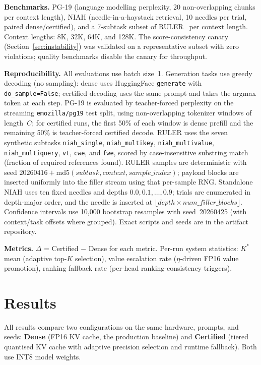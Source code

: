\documentclass[10pt,twocolumn,a4paper]{article}
\theoremstyle{definition}
\theoremstyle{remark}
\begin{document}
\textbf{Benchmarks.}  PG-19 (language modelling perplexity, 20 non-overlapping chunks per context length), NIAH (needle-in-a-haystack retrieval, 10 needles per trial, paired dense/certified), and a 7-subtask subset of RULER~\cite{ruler} per context length.  Context lengths: 8K, 32K, 64K, and 128K.  The score-consistency canary (Section~\ref{sec:instability}) was validated on a representative subset with zero violations; quality benchmarks disable the canary for throughput.

\textbf{Reproducibility.}  All evaluations use batch size~1.  Generation tasks use greedy decoding (no sampling): dense uses HuggingFace \texttt{generate} with \texttt{do\_sample=False}; certified decoding uses the same prompt and takes the argmax token at each step.  PG-19 is evaluated by teacher-forced perplexity on the streaming \texttt{emozilla/pg19} test split, using non-overlapping tokenizer windows of length~$C$; for certified runs, the first 50\% of each window is dense prefill and the remaining 50\% is teacher-forced certified decode.  RULER uses the seven synthetic subtasks \texttt{niah\_single}, \texttt{niah\_multikey}, \texttt{niah\_multivalue}, \texttt{niah\_multiquery}, \texttt{vt}, \texttt{cwe}, and \texttt{fwe}, scored by case-insensitive substring match (fraction of required references found).  RULER samples are deterministic with seed $20260416 + \mathrm{md5}(\mathit{subtask}, \mathit{context}, \mathit{sample\_index})$; payload blocks are inserted uniformly into the filler stream using that per-sample RNG\@.  Standalone NIAH uses ten fixed needles and depths $0.0, 0.1, \ldots, 0.9$; trials are enumerated in depth-major order, and the needle is inserted at $\lfloor\mathit{depth} \times \mathit{num\_filler\_blocks}\rfloor$.  Confidence intervals use 10{,}000 bootstrap resamples with seed~20260425 (with context/task offsets where grouped).  Exact scripts and seeds are in the artifact repository.

\textbf{Metrics.}  $\Delta$ = Certified $-$ Dense for each metric.  Per-run system statistics: $K^*$ mean (adaptive top-$K$ selection), value escalation rate ($\eta$-driven FP16 value promotion), ranking fallback rate (per-head ranking-consistency triggers).


\section{Results}
\label{sec:results}

All results compare two configurations on the same hardware, prompts, and seeds: \textbf{Dense} (FP16 KV cache, the production baseline) and \textbf{Certified} (tiered quantised KV cache with adaptive precision selection and runtime fallback).  Both use INT8 model weights.
\end{document}
